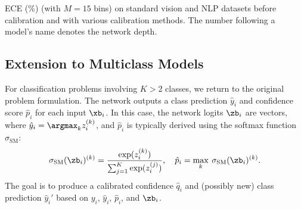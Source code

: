 
\begin{table*}[t!]
	\centering
	
  \caption{ECE (\%) (with $M=15$ bins) on standard vision and NLP datasets before calibration and with various calibration methods. The number following a model's name denotes the network depth.}
	\label{table.ece}
	\vspace{-2ex}
\end{table*}

\subsection{Extension to Multiclass Models}

For classification problems involving $K>2$ classes, we return to the original problem formulation.
The network outputs a class prediction $\hat y_i$ and confidence score $\hat p_i$ for each input $\xb_i$. In this case, the network logits $\zb_i$ are vectors, where $\hat y_i = \argmax_{k} z_i^{(k)}$, and $\hat p_i$ is typically derived using the softmax function $\sigma_\text{SM}$:
%
$$\sigma_\text{SM}(\zb_i)^{(k)} = \frac{\exp(z_i^{(k)})}
{\sum_{j=1}^K \exp(z_i^{(j)})}, \hspace{10pt}
\hat p_i = \max_k \: \sigma_\text{SM}(\zb_i)^{(k)}.$$
%
%
The goal is to produce a calibrated confidence $\hat q_i$ and (possibly new) class prediction $\hat y_i'$
based on $y_i$, $\hat y_i$, $\hat p_i$, and $\zb_i$.

